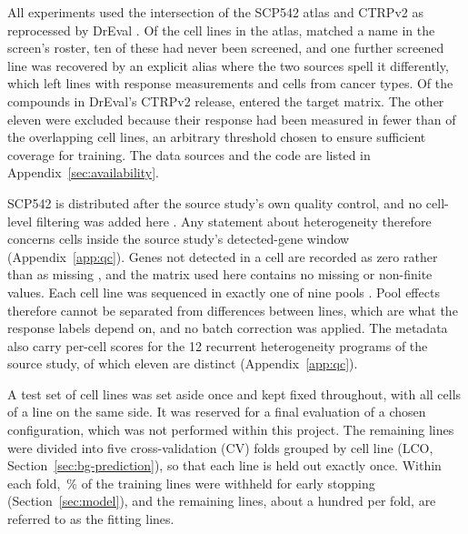 All experiments used the intersection of the SCP542 atlas \cite{scp542} and CTRPv2
\cite{ctrpv2,ctrp_rees} as reprocessed by DrEval \cite{dreval}. Of the \NLinesAtlas{} cell lines in
the atlas, \NLinesRoster{} matched a name in the screen's roster, ten of these had never been screened,
and one further screened line was recovered by an explicit alias where the two sources spell it
differently, which left \NLines{} lines with response measurements and \NCellsLabelled{} cells from \NCancerTypes{} cancer
types. Of the
\NDrugs{} compounds in DrEval's CTRPv2 release, \NDrugsModelled{} entered the target matrix. The other eleven were excluded because
their response had been measured in fewer than \NCovMinLines{} of the overlapping cell lines, an arbitrary
threshold chosen to ensure sufficient coverage for training. The data sources and the code are listed in
Appendix~\ref{sec:availability}.

SCP542 is distributed after the source study's own quality control, and no cell-level filtering was
added here \cite{scp542}. Any statement about heterogeneity therefore concerns cells inside the source
study's detected-gene window (Appendix~\ref{app:qc}). Genes not detected in a cell are recorded as zero
rather than as missing \cite{scp542}, and the matrix used here contains no missing or non-finite values.
Each cell line was sequenced in exactly one of nine pools \cite{scp542}. Pool effects therefore cannot be
separated from differences between lines, which are what the response labels depend on, and no batch
correction was applied.
The metadata also carry per-cell scores for the
12 recurrent heterogeneity programs of the source study, of which eleven are distinct
(Appendix~\ref{app:qc}).

A test set of \NLinesTest{} cell lines was set aside once and kept fixed throughout, with all cells of a
line on the same side.
It was reserved for a final evaluation of a chosen configuration, which was not performed within this
project. The remaining \NLinesCV{} lines were
divided into five cross-validation (CV) folds grouped by cell line (LCO, Section~\ref{sec:bg-prediction}), so that each line is held out exactly
once. Within each fold, \CfgHoldoutPct\,\% of the training lines were withheld for early stopping
(Section~\ref{sec:model}), and the remaining lines, about a hundred per fold, are referred to as the
fitting lines.

